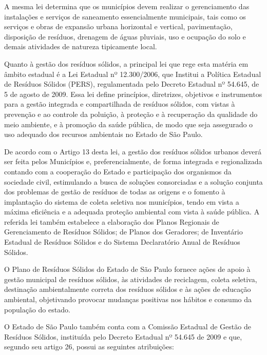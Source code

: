 	A mesma lei determina que os municípios devem realizar o gerenciamento das instalações e serviços de saneamento essencialmente municipais, tais como os serviços e obras de expansão urbana horizontal e vertical, pavimentação, disposição de resíduos, drenagem de águas pluviais, uso e ocupação do solo e demais atividades de natureza tipicamente local.
	
	Quanto à gestão dos resíduos sólidos, a principal lei que rege esta matéria em âmbito estadual é a Lei Estadual nº 12.300/2006,  que Institui a Política Estadual de Resíduos Sólidos (PERS), regulamentada pelo Decreto Estadual nº 54.645, de 5 de agosto de 2009. Essa lei define princípios, diretrizes, objetivos e instrumentos para a gestão integrada e compartilhada de resíduos sólidos, com vistas à prevenção e ao controle da poluição, à proteção e à recuperação da qualidade do meio ambiente, e à promoção da saúde pública, de modo que seja assegurado o uso adequado dos recursos ambientais no Estado de São Paulo.
	
	De acordo com o Artigo 13 desta lei, a gestão dos resíduos sólidos urbanos deverá ser feita pelos Municípios e, preferencialmente, de forma integrada e regionalizada contando com a cooperação do Estado e participação dos organismos da sociedade civil, estimulando a busca de soluções consorciadas e a solução conjunta dos problemas de gestão de resíduos de todas as origens e o fomento à implantação do sistema de coleta seletiva nos municípios, tendo em vista a máxima eficiência e a adequada proteção ambiental com vista à saúde pública. A referida lei também estabelece a elaboração dos Planos Regionais de Gerenciamento de Resíduos Sólidos; de Planos dos Geradores; de Inventário Estadual de Resíduos Sólidos e do Sistema Declaratório Anual de Resíduos Sólidos.
	
	O Plano de Resíduos Sólidos do Estado de São Paulo fornece ações de apoio à gestão municipal de resíduos sólidos, às atividades de reciclagem, coleta seletiva, destinação ambientalmente correta dos resíduos sólidos e às ações de educação ambiental, objetivando provocar mudanças positivas nos hábitos e consumo da população do estado.
	
	O Estado de São Paulo também conta com a Comissão Estadual de Gestão de Resíduos Sólidos, instituída pelo Decreto Estadual nº 54.645 de 2009 e que, segundo seu artigo 26, possui as seguintes atribuições:
	
	
